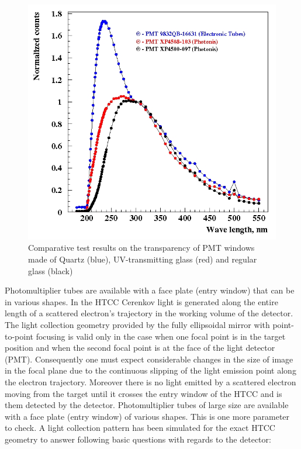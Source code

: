 \begin{figure}[!h]
    \centering
    \includegraphics[width=1.0\linewidth,trim={1.7cm 0.5cm 0.05cm 0.1cm},clip]{images/Quartz_UV_glass.jpg}
    \caption{Comparative test results on the transparency of PMT windows made of Quartz (blue), UV-transmitting glass (red) and regular glass (black)}
    \label{fig:Quartz_UV_glass}
\end{figure}

Photomultiplier tubes are available with a face plate (entry window) that can be in various shapes. In the HTCC Cerenkov light is generated along the entire length of a scattered electron's trajectory in the working volume of the detector. The light collection geometry provided by the fully ellipsoidal mirror with point-to-point focusing is valid only in the case when one focal point is in the target position and when the second focal point is at the face of the light detector (PMT). Consequently one must expect considerable changes in the size of image in the focal plane due to the continuous slipping of the light emission point along the electron trajectory. Moreover there is no light emitted by a scattered electron moving from the target until it crosses the entry window of the HTCC and is them detected by the detector. Photomultiplier tubes of large size are available with a face plate (entry window) of various shapes. This is one more parameter to check. A light collection pattern has been simulated for the exact HTCC geometry to answer following basic questions with regards to the detector:

